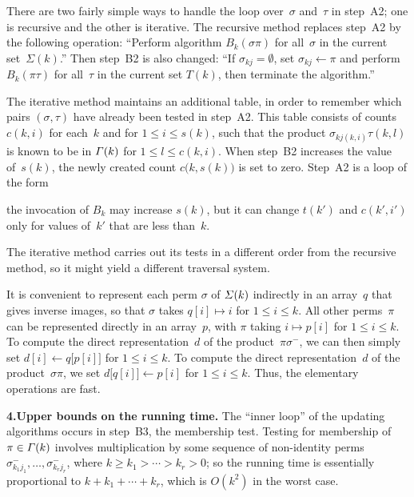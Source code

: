 There are two fairly simple ways to handle the loop over~$\sigma$
and~$\tau$ in step~A2; one is recursive and the other is iterative.
The recursive method replaces step~A2 by the following operation:
``Perform algorithm $B_k(\sigma\pi)$ for all~$\sigma$ in the current
set~$\Sigma(k)$.'' Then step~B2 is also changed: ``If
$\sigma_{kj}=\emptyset$, set $\sigma_{kj}\gets \pi$ and perform
$B_k(\pi\tau)$ for all~$\tau$ in the current set $T(k)$, then
terminate the algorithm.''

The iterative method maintains an additional table, in order to
remember which pairs $(\sigma,\tau)$ have already been tested in
step~A2. This table consists of counts $c(k,i)$ for each~$k$ and for
$1\leq i\leq s(k)$, such that the product $\sigma_{kj(k,i)}\tau(k,l)$
is known to be in ${\mit\Gamma}(k)$ for $1\leq l\leq c(k,i)$. When step~B2
increases the value of~$s(k)$, the newly created count
$c\bigl(k,s(k)\bigr)$ is set to zero. Step~A2 is a loop of the form

\smallskip
{}

\smallskip
\noindent
the invocation of $B_k$ may increase $s(k)$, but it can change $t(k')$
and $c(k',i')$ only for values of~$k'$ that are less than~$k$.

The iterative method carries out its tests in a different order from
the recursive method, so it might yield a different traversal system.

It is convenient to represent each perm $\sigma$ of ${\mit\Sigma}(k)$ indirectly
in an array~$q$ that gives inverse images, so that $\sigma$ takes
$q[i]\mapsto i$ for $1\le i\le k$. All other perms~$\pi$ can be represented
directly in an array~$p$, with $\pi$ taking $i\mapsto p[i]$ for
$1\le i\le k$. To compute the direct representation~$d$ of the 
product~$\pi\sigma^-$, we can then simply set $d[i]\gets q\bigl[p[i]\bigr]$ for
$1\le i\le k$. To compute the direct representation~$d$ of the product~$\sigma\pi$,
we set $d\bigl[q[i]\bigr]\gets p[i]$ for $1\le i\le k$. Thus, the elementary operations
are fast.

\medskip
\noindent
{\bf 4.\enspace Upper bounds on the running time.}\enspace
The ``inner loop'' of the updating algorithms occurs in step~B3, the membership
test. Testing for membership of $\pi\in{\mit\Gamma}(k)$ involves multiplication
by some sequence of non-identity perms
$\sigma_{k_1j_1}^-,\ldots,\sigma_{k_rj_r}^-$,
where
$k\geq k_1>\cdots >k_r>0$;
so the running time is essentially proportional to $k+k_1+\cdots +k_r$,
which is $O(k^2)$ in the worst case.

